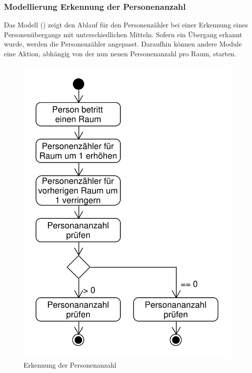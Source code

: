 \subsubsection{Modellierung Erkennung der Personenanzahl}
Das Modell () zeigt den Ablauf für den Personenzähler bei einer Erkennung eines Personenübergangs mit unterschiedlichen Mitteln. Sofern ein Übergang erkannt wurde, werden die Personenzähler angepasst. Daraufhin können andere Module eine Aktion, abhängig von der nun neuen Personenanzahl pro Raum, starten.

\begin{figure}[h!]
	\centering
	\includegraphics[scale=0.7]{img/Szenarien/ErkennungAnzahlPersonen.pdf}
	\caption{Erkennung der Personenanzahl}
	\label{fig:szenarienPersonenerkennung}
\end{figure}

